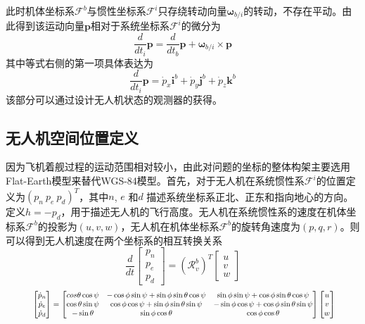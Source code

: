 此时机体坐标系$\mathcal{F}^b$与惯性坐标系$\mathcal{F}^i$只存绕转动向量$\mathbf{\omega}_{b/i}$的转动，不存在平动。由此得到该运动向量$\mathbf{p}$相对于系统坐标系$\mathcal{F}^i$的微分为
\begin{equation} \label{chp02_vector_derivative}
\frac{d}{dt_i} \mathbf{p} = \frac{d}{dt_b} \mathbf{p} + \mathbf{\omega}_{b/i} \times \mathbf{p}
\end{equation}
其中等式右侧的第一项具体表达为
\begin{equation}
\frac{d}{dt_i} \mathbf{p} = \dot{p}_x \mathbf{i}^b +  \dot{p}_y \mathbf{j}^b +  \dot{p}_z \mathbf{k}^b
\end{equation}
该部分可以通过设计无人机状态的观测器的获得。

\subsection{无人机空间位置定义}
因为飞机着舰过程的运动范围相对较小，由此对问题的坐标的整体构架主要选用Flat-Earth模型来替代WGS-84模型。首先，对于无人机在系统惯性系$\mathcal{F}^i$的位置定义为$(p_n\ p_e\ p_d)^T$，其中$n$, $e$  和$d$ 描述系统坐标系正北、正东和指向地心的方向。定义$h = -p_d$，用于描述无人机的飞行高度。无人机在系统惯性系的速度在机体坐标系$\mathcal{F}^b$的投影为$(u, v, w)$，无人机在机体坐标系$\mathcal{F}^b$的旋转角速度为$(p, q, r)$。则可以得到无人机速度在两个坐标系的相互转换关系
\begin{equation}
\frac{d}{dt} \begin{bmatrix} p_n \\ p_e \\ p_d \end{bmatrix}   =  (\mathcal{R}_v^b)^T \begin{bmatrix} u \\  v \\ w \end{bmatrix}  
\end{equation}
\begin{equation}
\resizebox{.9 \textwidth}{!} 
{ $
\begin{bmatrix} \dot{p}_n \\ \dot{p}_e \\ \dot{p}_d \end{bmatrix} = \begin{bmatrix}  cos \theta \cos \psi   &     -\cos\phi \sin\psi + \sin\phi \sin\theta \cos\psi                        &  \sin\phi \sin\psi + \cos\phi \sin\theta \cos\psi       \\
\cos\theta \sin\psi    & \cos\phi \cos\psi + \sin\phi \sin\theta\sin\psi   & -\sin\phi \cos\psi + \cos\phi \sin\theta \sin\psi \\
-\sin\theta  & \sin\phi \cos\theta & \cos\phi \cos\theta
\end{bmatrix} \begin{bmatrix} u \\  v \\ w \end{bmatrix}
$}
\end{equation}
